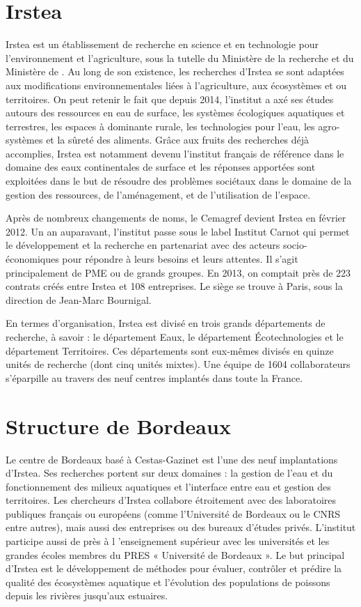 \documentclass[12pt,a4paper,titlepage,twoside]{report}
\begin{document}
\section{Irstea}
Irstea est un établissement de recherche en science et en technologie pour l’environnement et l’agriculture, sous la tutelle du Ministère de la recherche et du Ministère de . Au long de son existence, les recherches d'Irstea se sont adaptées aux modifications environnementales liées à l’agriculture, aux écosystèmes et ou territoires. On peut retenir le fait que depuis 2014, l’institut a axé ses études autours des ressources en eau de surface, les systèmes écologiques aquatiques et terrestres, les espaces à dominante rurale, les technologies pour l'eau, les agro-systèmes et la sûreté des aliments. Grâce aux fruits des recherches déjà accomplies, Irstea est notamment devenu l'institut français de référence dans le domaine des eaux continentales de surface et les réponses apportées sont exploitées dans le but de résoudre des problèmes sociétaux dans le domaine de la gestion des ressources, de l'aménagement, et de l'utilisation de l'espace.

	Après de nombreux changements de noms, le Cemagref devient Irstea en février 2012. Un an auparavant, l'institut passe sous le label Institut Carnot qui permet le développement et la recherche en partenariat avec des acteurs socio-économiques pour répondre à leurs besoins et leurs attentes. Il s'agit principalement de PME ou de grands groupes. En 2013, on comptait près de 223 contrats créés entre Irstea et 108 entreprises.
	Le siège se trouve à Paris, sous la direction de Jean-Marc Bournigal.
	
	En termes d'organisation, Irstea est divisé en trois grands départements de recherche, à savoir : le département Eaux, le département Écotechnologies et le département Territoires. Ces départements sont eux-mêmes divisés en quinze unités de recherche (dont cinq unités mixtes). Une équipe de 1604 collaborateurs s'éparpille au travers des neuf centres implantés dans toute la France.

\clearpage
\section{Structure de Bordeaux}
Le centre de Bordeaux basé à Cestas-Gazinet est l'une des neuf implantations d'Irstea. Ses recherches portent sur deux domaines : la gestion de l'eau et du fonctionnement des milieux aquatiques et l'interface entre eau et gestion des territoires. Les chercheurs d'Irstea collabore étroitement avec des laboratoires publiques français ou européens (comme l'Université de Bordeaux ou le CNRS entre autres), mais aussi des entreprises ou des bureaux d'études privés. L'institut participe aussi de près à l 'enseignement supérieur avec les universités et les grandes écoles membres du PRES « Université de Bordeaux ». Le but principal d'Irstea est le développement de méthodes pour évaluer, contrôler et prédire la qualité des écosystèmes aquatique et l'évolution des populations de poissons depuis les rivières jusqu'aux estuaires.
\end{document}
